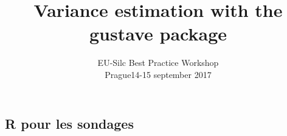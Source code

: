 \documentclass[12pt,ignorenonframetext,]{beamer}
\institute{
	\texttt{[image: Logo\_Insee.png]} \\ ~ \\ 
	\normalsize Martin \textsc{Chevalier}
}
\author{EU-Silc Best Practice Workshop \\ Prague14-15 september 2017}
\date{}
\title{Variance estimation with the gustave package}
\date{}
\begin{document}
\frame{\titlepage}

\subsection*{R pour les sondages}\label{r-pour-les-sondages}
\end{document}
